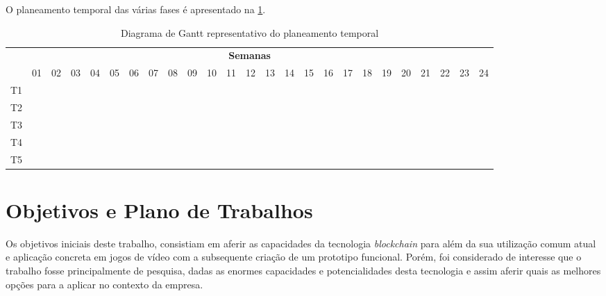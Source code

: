 O planeamento temporal das várias fases é apresentado na \cref{tab:diagrama-temporal}.

\begin{table}[H]
  \centering
  \footnotesize
  \def\arraystretch{2}
  \setlength\tabcolsep{3pt}
  \begin{tabularx}{\textwidth}
  {l*{24}{c}}
  \multicolumn{25}{c}{\textbf{Semanas}}\\
    &
    \multicolumn{1}{c}{01}&
    \multicolumn{1}{c}{02}&
    \multicolumn{1}{c}{03}&
    \multicolumn{1}{c}{04}&
    \multicolumn{1}{c}{05}&
    \multicolumn{1}{c}{06}&
    \multicolumn{1}{c}{07}&
    \multicolumn{1}{c}{08}&
    \multicolumn{1}{c}{09}&
    \multicolumn{1}{c}{10}&
    \multicolumn{1}{c}{11}&
    \multicolumn{1}{c}{12}&
    \multicolumn{1}{c}{13}&
    \multicolumn{1}{c}{14}&
    \multicolumn{1}{c}{15}&
    \multicolumn{1}{c}{16}&
    \multicolumn{1}{c}{17}&
    \multicolumn{1}{c}{18}&
    \multicolumn{1}{c}{19}&
    \multicolumn{1}{c}{20}&
    \multicolumn{1}{c}{21}&
    \multicolumn{1}{c}{22}&
    \multicolumn{1}{c}{23}&
    \multicolumn{1}{c}{24}
    \tabularnewline 
    T1 &
    \cellcolor{blue}{}&\cellcolor{blue}{}&
    \cellcolor{blue}{}&\cellcolor{blue}{}&
    \cellcolor{blue}{}&\\
    T2 &
    &&&&&
    \cellcolor{blue}{}&\cellcolor{blue}{}&
    \cellcolor{blue}{}&\cellcolor{blue}{}&\\
    T3 &
    &&&&&&&&&
    \cellcolor{blue}{}&\cellcolor{blue}{}&
    \cellcolor{blue}{}&\\
    T4 &
    &&&&&&&&&&&&
    \cellcolor{blue}{}&\cellcolor{blue}{}&
    \cellcolor{blue}{}&\cellcolor{blue}{}&
    \cellcolor{blue}{}&\cellcolor{blue}{}&
    \cellcolor{blue}{}&\cellcolor{blue}{}&
    \cellcolor{blue}{}&\cellcolor{blue}{}&\\
    T5 &
    &&&&&&&&&&&&&&&&&&&&&&
    \cellcolor{blue}{}&\cellcolor{blue}{}
  \end{tabularx}
  \caption{Diagrama de Gantt representativo do planeamento temporal}
  \label{tab:diagrama-temporal}
\end{table}

\section{Objetivos e Plano de Trabalhos}

Os objetivos iniciais deste trabalho, consistiam em aferir as capacidades da tecnologia \textit{blockchain} para além da sua utilização comum atual e aplicação concreta em jogos de vídeo com a subsequente criação de um prototipo funcional. Porém, foi considerado de interesse que o trabalho fosse principalmente de pesquisa, dadas as enormes capacidades e potencialidades desta tecnologia e assim aferir quais as melhores opções para a aplicar no contexto da empresa.

